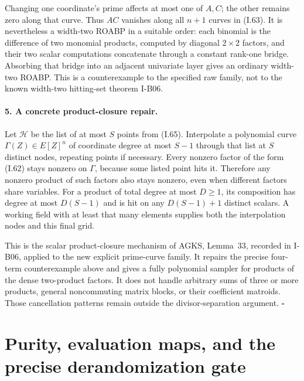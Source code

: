 \documentclass[11pt,a4paper]{article}
\theoremstyle{definition}\newtheorem{definition}{Definition}
\begin{document}
Changing one coordinate's prime affects at most one of
$A,C$; the other remains zero along that curve.  Thus
$AC$ vanishes along all $n+1$ curves in (I.63).
It is nevertheless a width-two ROABP in a suitable order:
each binomial is the difference of two monomial products,
computed by diagonal $2\times2$ factors, and their two
scalar computations concatenate through a constant
rank-one bridge.  Absorbing that bridge into an adjacent
univariate layer gives an ordinary width-two ROABP.
This is a counterexample to the specified raw family,
not to the known width-two hitting-set theorem I-B06.

\paragraph{5. A concrete product-closure repair.}
Let $\mathcal H$ be the list of at most $S$ points from
(I.65).  Interpolate a polynomial curve
$\Gamma(Z)\in E[Z]^n$ of coordinate degree at most $S-1$
through that list at $S$ distinct nodes, repeating points
if necessary.  Every nonzero factor of the form (I.62)
stays nonzero on $\Gamma$, because some listed point hits it.
Therefore any nonzero product of such factors also stays
nonzero, even when different factors share variables.
For a product of total degree at most $D\ge1$, its
composition has degree at most $D(S-1)$ and is hit on any
$D(S-1)+1$ distinct scalars.  A working field with at least
that many elements supplies both the interpolation nodes
and this final grid.

This is the scalar product-closure mechanism of AGKS,
Lemma~33, recorded in I-B06, applied to the new explicit
prime-curve family.  It repairs the precise four-term
counterexample above and gives a fully polynomial sampler
for products of the dense two-product factors.  It does
not handle arbitrary sums of three or more products,
general noncommuting matrix blocks, or their coefficient
matroids.  Those cancellation patterns remain outside
the divisor-separation argument.
\hfill$\square$


\section{Purity, evaluation maps, and the precise derandomization gate}
\end{document}
